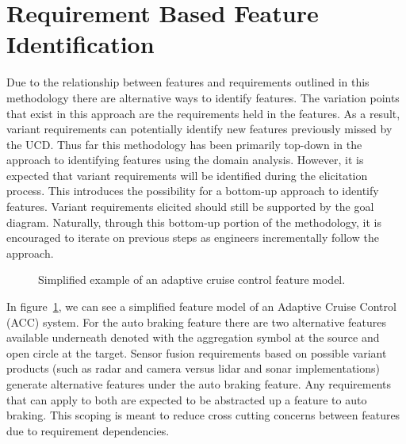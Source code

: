 \section{Requirement Based Feature Identification}

Due to the relationship between features and requirements outlined in this methodology there are alternative ways to identify features. The variation points that exist in this approach are the requirements held in the features. As a result, variant requirements can potentially identify new features previously missed by the \ac{UCD}. Thus far this methodology has been primarily top-down in the approach to identifying features using the domain analysis. However, it is expected that variant requirements will be identified during the elicitation process. This introduces the possibility for a bottom-up approach to identify features. Variant requirements elicited should still be supported by the goal diagram. Naturally, through this bottom-up portion of the methodology, it is encouraged to iterate on previous steps as engineers incrementally follow the approach.

\begin{figure}
	\centering
	
	\caption{Simplified example of an adaptive cruise control feature model.}
	\label{fig:acc_fm}
\end{figure}

In figure~\ref{fig:acc_fm}, we can see a simplified feature model of an Adaptive Cruise Control (ACC) system. For the auto braking feature there are two alternative features available underneath denoted with the aggregation symbol at the source and open circle at the target. Sensor fusion requirements based on possible variant products (such as radar and camera versus lidar and sonar implementations) generate alternative features under the auto braking feature. Any requirements that can apply to both are expected to be abstracted up a feature to auto braking. This scoping is meant to reduce cross cutting concerns between features due to requirement dependencies.






